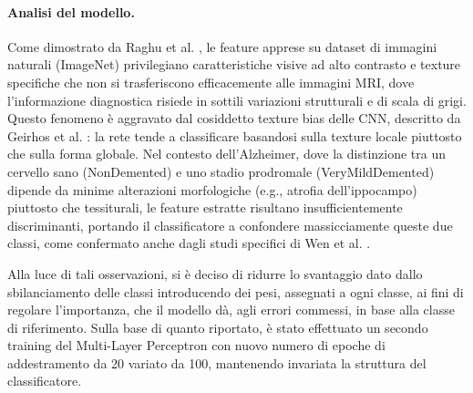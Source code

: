 \paragraph{Analisi del modello.}
Come dimostrato da Raghu et al. \cite{raghu2019transfusion}, le feature apprese su dataset di immagini naturali (ImageNet) privilegiano caratteristiche visive ad alto contrasto e texture specifiche che non si trasferiscono efficacemente alle immagini MRI, dove l'informazione diagnostica risiede in sottili variazioni strutturali e di scala di grigi. Questo fenomeno è aggravato dal cosiddetto texture bias delle CNN, descritto da Geirhos et al. \cite{geirhos2018imagenet}: la rete tende a classificare basandosi sulla texture locale piuttosto che sulla forma globale. Nel contesto dell'Alzheimer, dove la distinzione tra un cervello sano (NonDemented) e uno stadio prodromale (VeryMildDemented) dipende da minime alterazioni morfologiche (e.g., atrofia dell'ippocampo) piuttosto che tessiturali, le feature estratte risultano insufficientemente discriminanti, portando il classificatore a confondere massicciamente queste due classi, come confermato anche dagli studi specifici di Wen et al. \cite{wen2020convolutional}.

Alla luce di tali osservazioni, si è deciso di ridurre lo svantaggio dato dallo sbilanciamento delle classi introducendo dei pesi, assegnati a ogni classe, ai fini di regolare l'importanza, che il modello dà, agli errori commessi, in base alla classe di riferimento. Sulla base di quanto riportato, è stato effettuato un secondo training del Multi-Layer Perceptron con nuovo numero di epoche
di addestramento da 20 variato da 100, mantenendo invariata la struttura del classificatore.

